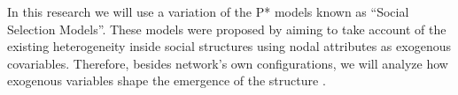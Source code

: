 \documentclass[a4paper, 12pt, openright, oneside, german, french, brazil, english, article]{abntex2}
\begin{document}
	
	In this research we will use a variation of the P* models known as ``Social Selection Models''. These models were proposed by  aiming to take account of the existing heterogeneity inside social structures using nodal attributes as exogenous covariables. Therefore, besides network's own configurations, we will analyze how exogenous variables shape the emergence of the structure \cite{wang2016social}.
	
	
	
	
	
	
	
	
\postextual
{}

\end{document}
